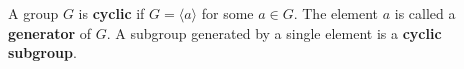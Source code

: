 \begin{definition}
A group $G$ is \textbf{cyclic} if $G = \langle a \rangle$ for some $a \in G$. The element $a$ is called a \textbf{generator} of $G$. A subgroup generated by a single element is a \textbf{cyclic subgroup}.
\end{definition}

